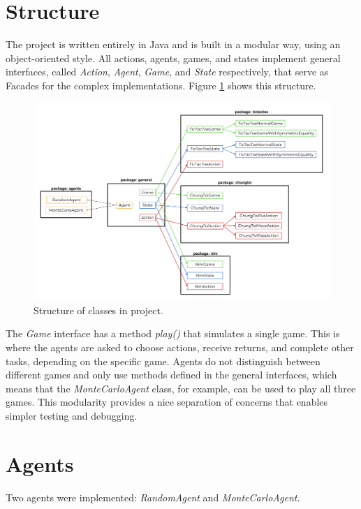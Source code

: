 \documentclass[11pt,a4paper]{report}
\begin{document}
\section{Structure}

The project is written entirely in Java and is built in a modular way, using an object-oriented style. All actions, agents, games, and states implement general interfaces, called \emph{Action}, \emph{Agent}, \emph{Game}, and \emph{State} respectively, that serve as Facades for the complex implementations. Figure \ref{code-structure} shows this structure.

\begin{figure}[htbp]
	\begin{center}
		\includegraphics[width=125mm]{code_structure.png}
		\caption{Structure of classes in project.}
		\label{code-structure}
	\end{center}
\end{figure}

The \emph{Game} interface has a method \emph{play()} that simulates a single game. This is where the agents are asked to choose actions, receive returns, and complete other tasks, depending on the specific game. Agents do not distinguish between different games and only use methods defined in the general interfaces, which means that the \emph{MonteCarloAgent} class, for example, can be used to play all three games. This modularity provides a nice separation of concerns that enables simpler testing and debugging.


\section{Agents}
\label{sec:Agents}

Two agents were implemented: \emph{RandomAgent} and \emph{MonteCarloAgent}.
\end{document}

